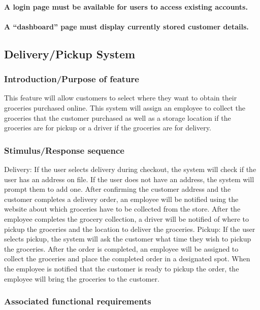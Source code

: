 \documentclass{scrreprt}
\begin{document}
\paragraph[]{\normalfont A login page must be available for users to access existing accounts.}
\paragraph[]{\normalfont A “dashboard” page must display currently stored customer details.}


\subsection{Delivery/Pickup System}
\subsubsection{Introduction/Purpose of feature}
This feature will allow customers to select where they want to obtain their groceries purchased online.  This system will assign an employee to collect the groceries that the customer purchased as well as a storage location if the groceries are for pickup or a driver if the groceries are for delivery.
\subsubsection{Stimulus/Response sequence}
Delivery: If the user selects delivery during checkout, the system will check if the user has an address on file.  If the user does not have an address, the system will prompt them to add one.  After confirming the customer address and the customer completes a delivery order, an employee will be notified using the website about which groceries have to be collected from the store.  After the employee completes the grocery collection, a driver will be notified of where to pickup the groceries and the location to deliver the groceries.
Pickup: If the user selects pickup, the system will ask the customer what time they wish to pickup the groceries.  After the order is completed, an employee will be assigned to collect the groceries and place the completed order in a designated spot.  When the employee is notified that the customer is ready to pickup the order, the employee will bring the groceries to the customer.

\subsubsection{Associated functional requirements}
\end{document}
